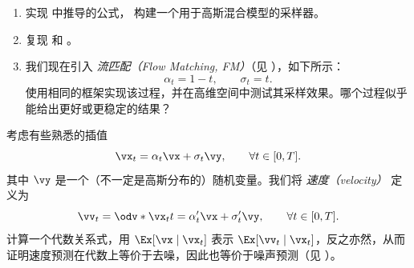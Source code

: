 \documentclass[../../book-main_zh.tex]{subfiles}
\begin{document}
    \begin{exercise}\label{exercise:implement_denoising_processes}
        \phantom{}
        \begin{enumerate}
            \item 实现
                 中推导的公式，
                构建一个用于高斯混合模型的采样器。
            \item 复现  和
                。
            \item 我们现在引入 \textit{流匹配（Flow
                Matching, FM）}（见 ），如下所示：
                \begin{equation}
                    \alpha_{t} = 1 - t, \qquad \sigma_{t} = t.
                \end{equation}
                使用相同的框架实现该过程，并在高维空间中测试其采样效果。哪个过程似乎能给出更好或更稳定的结果？
        \end{enumerate}
    \end{exercise}

    \begin{exercise}\label{exercise:velocity_prediction}
        考虑有些熟悉的插值
        \begin{equation}
            \vx_{t} = \alpha_{t}\vx + \sigma_{t}\vy, \qquad \forall t
            \in [0, T].
        \end{equation}
        其中 \(\vy\) 是一个（不一定是高斯分布的）随机变量。我们将 \textit{速度（velocity）} 定义为
        \begin{equation}
            \vv_{t} = \odv*{\vx_{t}}{t} = \alpha_{t}^{\prime}\vx +
            \sigma_{t}^{\prime}\vy, \qquad \forall t \in [0, T].
        \end{equation}
        计算一个代数关系式，用 \(\Ex[\vx \mid \vx_{t}]\) 表示 \(\Ex[\vv_{t} \mid
        \vx_{t}]\)，反之亦然，从而证明速度预测在代数上等价于去噪，因此也等价于噪声预测（见 ）。
    \end{exercise}

    
\end{document}
